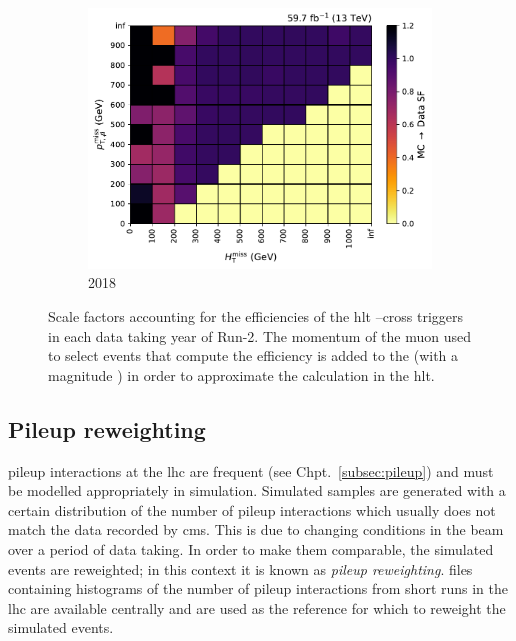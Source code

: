 \begin{figure}[htbp]
    \begin{subfigure}[b]{0.48\textwidth}
        \includegraphics[width=\textwidth]{figures/trigger_efficiencies/2018/SFs.pdf}
        \caption{2018}
    \end{subfigure}
    \caption[Scale factors accounting for the efficiencies of the HLT \ptmiss--\mht cross triggers in each data taking year of Run-2]{Scale factors accounting for the efficiencies of the \acrshort{hlt} \ptmiss--\mht cross triggers in each data taking year of Run-2. The momentum of the muon used to select events that compute the efficiency is added to the \ptvecmiss (with a magnitude \ptmissNoMu) in order to approximate the calculation in the \acrlong{hlt}.}
    \label{fig:htoinv_trig_effs}
\end{figure}




\subsection{Pileup reweighting}
\label{subsec:pu_reweighting}

\Gls{pileup} interactions at the \acrshort{lhc} are frequent (see Chpt.~\ref{subsec:pileup}) and must be modelled appropriately in simulation. Simulated samples are generated with a certain distribution of the number of \gls{pileup} interactions which usually does not match the data recorded by \acrshort{cms}. This is due to changing conditions in the beam over a period of data taking. In order to make them comparable, the simulated events are reweighted; in this context it is known as \emph{\gls{pileup} reweighting}. \ROOT files containing histograms of the number of \gls{pileup} interactions from short runs in the \acrshort{lhc} are available centrally and are used as the reference for which to reweight the simulated events.

